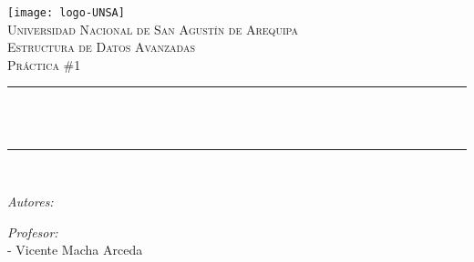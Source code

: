 \begin{titlepage}

\centering
\texttt{[image: logo-UNSA]}\\[1.0 cm]
\textsc{\LARGE Universidad Nacional de San Agustín de Arequipa}\\[2.0 cm]
\textsc{\Large Estructura de Datos Avanzadas}\\[0.5 cm]
\textsc{\large Práctica \#1}\\[0.5 cm]
\rule{\linewidth}{0.2 mm} \\[0.4 cm]
{ \huge \bfseries \thetitle}\\
\rule{\linewidth}{0.2 mm} \\[1.5 cm]

\begin{flushleft} \large
  \emph{Autores:}\\
\theauthor
\end{flushleft}

\begin{flushleft} \large
  \emph{Profesor:}\\
  - Vicente Macha Arceda \\
\end{flushleft}

\vfill

{\large \thedate}

\end{titlepage}
